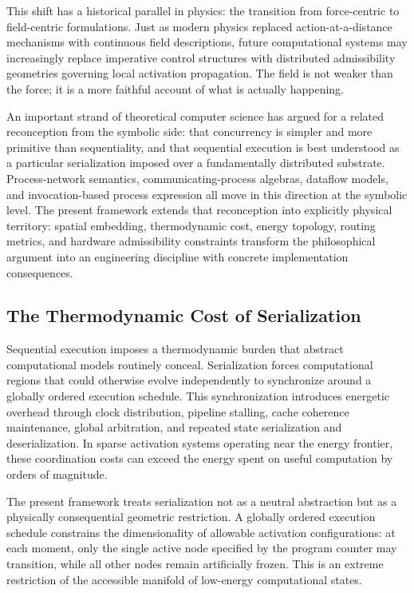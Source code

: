 \documentclass[11pt, a4paper]{article}
\begin{document}
This shift has a historical parallel in physics: the transition from force-centric
to field-centric formulations. Just as modern physics replaced action-at-a-distance
mechanisms with continuous field descriptions, future computational systems may
increasingly replace imperative control structures with distributed admissibility
geometries governing local activation propagation. The field is not weaker than the
force; it is a more faithful account of what is actually happening.

An important strand of theoretical computer science has argued for a related
reconception from the symbolic side: that concurrency is simpler and more primitive
than sequentiality, and that sequential execution is best understood as a particular
serialization imposed over a fundamentally distributed substrate. Process-network
semantics, communicating-process algebras, dataflow models, and invocation-based
process expression all move in this direction at the symbolic level. The present
framework extends that reconception into explicitly physical territory: spatial
embedding, thermodynamic cost, energy topology, routing metrics, and hardware
admissibility constraints transform the philosophical argument into an engineering
discipline with concrete implementation consequences.

\subsection{The Thermodynamic Cost of Serialization}

Sequential execution imposes a thermodynamic burden that abstract computational
models routinely conceal. Serialization forces computational regions that could
otherwise evolve independently to synchronize around a globally ordered execution
schedule. This synchronization introduces energetic overhead through clock
distribution, pipeline stalling, cache coherence maintenance, global arbitration,
and repeated state serialization and deserialization. In sparse activation systems
operating near the energy frontier, these coordination costs can exceed the energy
spent on useful computation by orders of magnitude.

The present framework treats serialization not as a neutral abstraction but as a
physically consequential geometric restriction. A globally ordered execution
schedule constrains the dimensionality of allowable activation configurations:
at each moment, only the single active node specified by the program counter may
transition, while all other nodes remain artificially frozen. This is an extreme
restriction of the accessible manifold of low-energy computational states.
\end{document}
